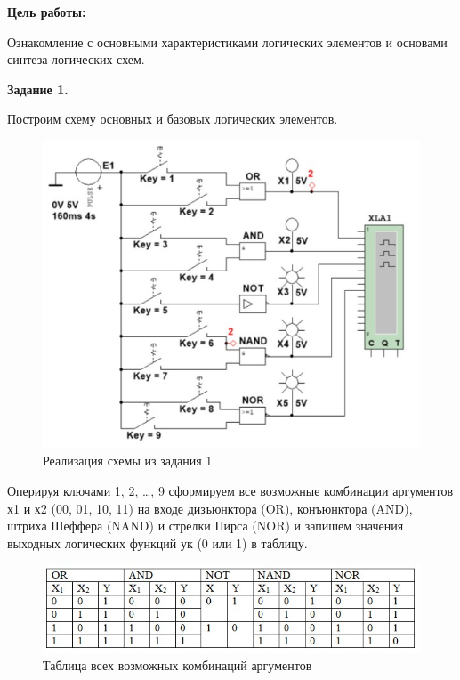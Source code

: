 \documentclass[spec, och, labwork]{shiza}
\begin{document}
\tableofcontents

\textbf{Цель работы:}

Ознакомление с основными характеристиками логических элементов и основами синтеза логических схем.

\textbf{Задание 1.}

Построим схему основных и базовых логических элементов.

    \begin{figure}[H]
        \centering      %
        \includegraphics[width=1.\textwidth]{1}
        \caption{Реализация схемы из задания 1}
        \label{fig:image1}
    \end{figure}
        
    Оперируя ключами 1, 2, …, 9 сформируем все возможные комбинации аргументов х1 и х2 (00, 01, 10, 11) на входе 
    дизъюнктора (OR), конъюнктора (AND), штриха Шеффера (NAND) и стрелки Пирса (NOR) и запишем значения выходных 
    логических функций ук (0 или 1) в таблицу.

    \begin{figure}[H]
        \centering      %
        \includegraphics[width=1.\textwidth]{2}
        \caption{Таблица всех возможных комбинаций аргументов}
        \label{fig:image1}
    \end{figure}
        
\end{document}
